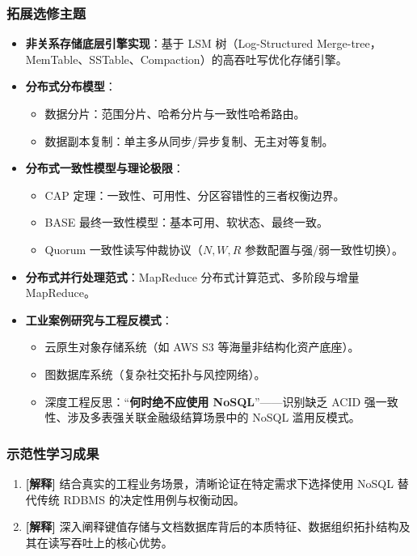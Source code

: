 \subsubsection{拓展选修主题}
\begin{itemize}
    \item \textbf{非关系存储底层引擎实现}：基于 LSM 树（Log-Structured Merge-tree，MemTable、SSTable、Compaction）的高吞吐写优化存储引擎。
    \item \textbf{分布式分布模型}：
    \begin{itemize}
        \item 数据分片：范围分片、哈希分片与一致性哈希路由。
        \item 数据副本复制：单主多从同步/异步复制、无主对等复制。
    \end{itemize}
    \item \textbf{分布式一致性模型与理论极限}：
    \begin{itemize}
        \item CAP 定理：一致性、可用性、分区容错性的三者权衡边界。
        \item BASE 最终一致性模型：基本可用、软状态、最终一致。
        \item Quorum 一致性读写仲裁协议（$N, W, R$ 参数配置与强/弱一致性切换）。
    \end{itemize}
    \item \textbf{分布式并行处理范式}：MapReduce 分布式计算范式、多阶段与增量 MapReduce。
    \item \textbf{工业案例研究与工程反模式}：
    \begin{itemize}
        \item 云原生对象存储系统（如 AWS S3 等海量非结构化资产底座）。
        \item 图数据库系统（复杂社交拓扑与风控网络）。
        \item 深度工程反思：“\textbf{何时绝不应使用 NoSQL}”——识别缺乏 ACID 强一致性、涉及多表强关联金融级结算场景中的 NoSQL 滥用反模式。
    \end{itemize}
\end{itemize}

\subsubsection{示范性学习成果}
\begin{enumerate}
    \item \textbf{[解释]} 结合真实的工程业务场景，清晰论证在特定需求下选择使用 NoSQL 替代传统 RDBMS 的决定性用例与权衡动因。
    \item \textbf{[解释]} 深入阐释键值存储与文档数据库背后的本质特征、数据组织拓扑结构及其在读写吞吐上的核心优势。
\end{enumerate}

